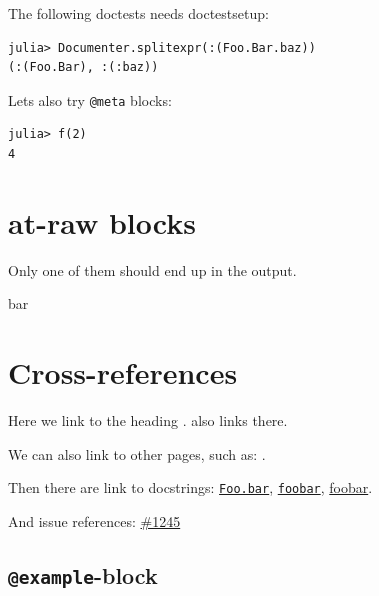 The following doctests needs doctestsetup:




\begin{verbatim}
julia> Documenter.splitexpr(:(Foo.Bar.baz))
(:(Foo.Bar), :(:baz))
\end{verbatim}



Let{\textquotesingle}s also try \texttt{@meta} blocks:






\begin{verbatim}
julia> f(2)
4
\end{verbatim}





\section{at-raw blocks}



\label{14134642751930898430}{}


Only one of them should end up in the output.






bar



\section{Cross-references}



\label{12734752257024730942}{}


Here we link to the heading .  also links there.



We can also link to other pages, such as: .



Then there are link to docstrings: \href{@ref}{\texttt{Foo.bar}}, \href{@ref Foo.bar}{\texttt{foobar}}, \href{@ref Foo.bar}{foobar}.



And issue references: \href{https://example.org/Repository.jl/blob/1245}{\#1245}



\subsection{\texttt{@example}-block}



